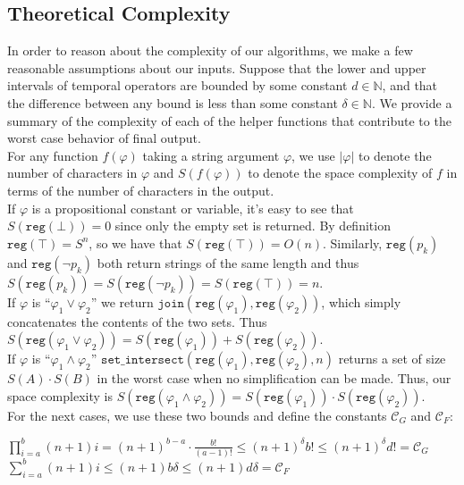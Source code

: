 \documentclass[runningheads]{llncs}
\renewcommand{\phi}{\varphi}
\begin{document}
\subsection{Theoretical Complexity}
\begin{flushleft}
In order to reason about the complexity of our algorithms, we make a few reasonable assumptions about our inputs.
Suppose that the lower and upper intervals of temporal operators are bounded by some constant $d \in \mathbb{N}$, and that the difference between any bound is less than some constant $\delta \in \mathbb{N}$. 
We provide a summary of the complexity of each of the helper functions that contribute to the worst case behavior of final output.\\
For any function $f(\phi)$ taking a string argument $\phi$, we use $|\phi|$ to denote the number of characters in $\phi$ and $S(f(\phi))$ to denote the space complexity of $f$ in terms of the number of characters in the output.\\
\hspace{3mm} If $\phi$ is a propositional constant or variable, it's easy to see that $S(\texttt{reg}(\bot)) = 0$ since only the empty set is returned. By definition $\texttt{reg}(\top) = S^n$, so we have that $S(\texttt{reg}(\top)) = O(n)$. Similarly, $\texttt{reg}(p_k)$ and $\texttt{reg}(\neg p_k)$ both return strings of the same length and thus $S(\texttt{reg}(p_k)) = S(\texttt{reg}(\neg p_k)) = S(\texttt{reg}(\top)) = n$.\\
\hspace{3mm} If $\phi$ is ``$\phi_{1} \lor \phi_{2}$'' we return $\texttt{join}(\texttt{reg}(\phi_{1}), \texttt{reg}(\phi_{2}))$, which simply concatenates the contents of the two sets. 
Thus $S(\texttt{reg}(\phi_{1} \lor \phi_{2})) = S(\texttt{reg}(\phi_{1})) + S(\texttt{reg}(\phi_{2})).$\\
\hspace{3mm} If $\phi$ is ``$\phi_{1} \land \phi_{2}$''
$ \texttt{set\_intersect}(\texttt{reg}(\phi_{1}), \texttt{reg}(\phi_{2}), n)$ returns a set of size $S(A) \cdot S(B)$ in the worst case when no simplification can be made. 
Thus, our space complexity is $S(\texttt{reg}(\phi_{1} \land \phi_{2})) = S(\texttt{reg}(\phi_{1})) \cdot S(\texttt{reg}(\phi_{2})).$\\
\hspace{3mm} For the next cases, we use these two bounds and define the constants $\mathcal{C}_G$ and $\mathcal{C}_F$:
{\centering $\prod_{i = a}^b (n+1)i = (n+1)^{b-a} \cdot \frac{b!}{(a-1)!} \leq (n+1)^\delta b! \leq (n+1)^\delta d!  = \mathcal{C}_G$ \\ $\sum_{i = a}^b (n+1)i \leq (n+1)b\delta \leq (n+1)d\delta  = \mathcal{C}_F$\par}

\end{flushleft}
\end{document}
